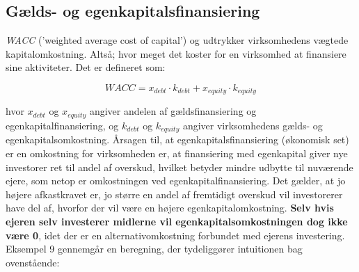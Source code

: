 \documentclass[10pt,reqno, usenames]{article}
\begin{document}
\subsection{Gælds- og egenkapitalsfinansiering}
\textit{WACC} ('weighted average cost of capital') og udtrykker virksomhedens vægtede kapitalomkostning. Altså; hvor meget det koster for en virksomhed at finansiere sine aktiviteter. Det er defineret som: 

\begin{equation}
    WACC = x_{debt} \cdot k_{debt} + x_{equity} \cdot k_{equity}
\end{equation}

hvor $x_{debt}$ og $x_{equity}$ angiver andelen af gældsfinansiering og egenkapitalfinansiering, og $k_{debt}$ og $k_{equity}$ angiver virksomhedens gælds- og egenkapitalsomkostning. Årsagen til, at egenkapitalsfinansiering (økonomisk set) er en omkostning for virksomheden er, at finansiering med egenkapital giver nye investorer
ret til andel af overskud, hvilket betyder mindre udbytte til nuværende ejere, som netop er omkostningen ved egenkapitalfinansiering. Det gælder, at jo højere afkastkravet er, jo større en andel af fremtidigt overskud vil investorerer have del af, hvorfor der vil være en højere egenkapitalomkostning. \textbf{Selv hvis ejeren selv investerer midlerne vil egenkapitalsomkostningen dog ikke være 0}, idet der er en alternativomkostning forbundet med ejerens investering. Eksempel 9 gennemgår en beregning, der tydeliggører intuitionen bag ovenstående: 
\end{document}
